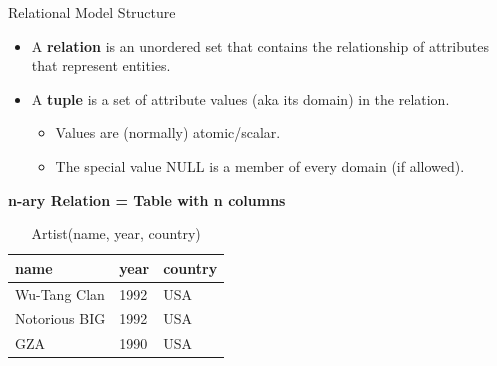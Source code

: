 \documentclass[aspectratio=169, 10pt]{beamer}
\begin{document}
\begin{frame}{Relational Model Structure}
    \begin{itemize}
        \item A \textbf{relation} is an unordered set that contains the relationship of attributes that represent entities.
        \item A \textbf{tuple} is a set of attribute values (aka its domain) in the relation.
        \begin{itemize}
            \item Values are (normally) atomic/scalar.
            \item The special value NULL is a member of every domain (if allowed).
        \end{itemize}
    \end{itemize}
    \vspace{1em}
    \textbf{n-ary Relation = Table with n columns}
    \small
    \begin{table}
    \begin{tabular}{lll}
    \toprule
    \textbf{name} & \textbf{year} & \textbf{country} \\
    \midrule
    Wu-Tang Clan & 1992 & USA \\
    Notorious BIG & 1992 & USA \\
    GZA & 1990 & USA \\
    \bottomrule
    \end{tabular}
    \caption{Artist(name, year, country)}
    \end{table}
\end{frame}
\end{document}
